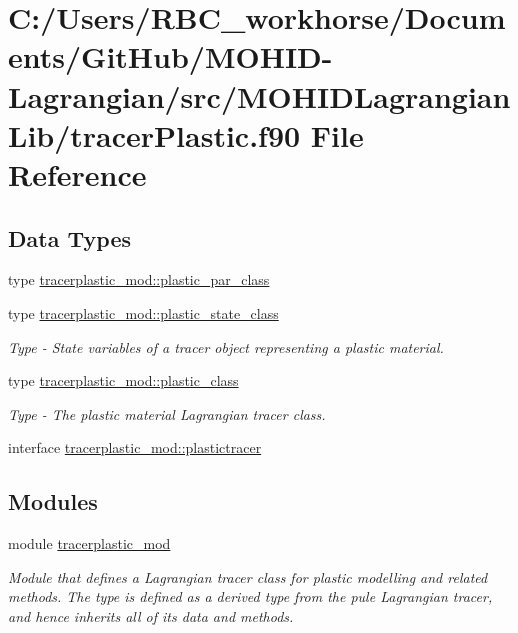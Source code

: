 \hypertarget{tracer_plastic_8f90}{}\section{C\+:/\+Users/\+R\+B\+C\+\_\+workhorse/\+Documents/\+Git\+Hub/\+M\+O\+H\+I\+D-\/\+Lagrangian/src/\+M\+O\+H\+I\+D\+Lagrangian\+Lib/tracer\+Plastic.f90 File Reference}
\label{tracer_plastic_8f90}
\subsection*{Data Types}
\begin{DoxyCompactItemize}
\item 
type \mbox{\hyperlink{structtracerplastic__mod_1_1plastic__par__class}{tracerplastic\+\_\+mod\+::plastic\+\_\+par\+\_\+class}}
\item 
type \mbox{\hyperlink{structtracerplastic__mod_1_1plastic__state__class}{tracerplastic\+\_\+mod\+::plastic\+\_\+state\+\_\+class}}
\begin{DoxyCompactList}\small\item\em Type -\/ State variables of a tracer object representing a plastic material. \end{DoxyCompactList}\item 
type \mbox{\hyperlink{structtracerplastic__mod_1_1plastic__class}{tracerplastic\+\_\+mod\+::plastic\+\_\+class}}
\begin{DoxyCompactList}\small\item\em Type -\/ The plastic material Lagrangian tracer class. \end{DoxyCompactList}\item 
interface \mbox{\hyperlink{interfacetracerplastic__mod_1_1plastictracer}{tracerplastic\+\_\+mod\+::plastictracer}}
\end{DoxyCompactItemize}
\subsection*{Modules}
\begin{DoxyCompactItemize}
\item 
module \mbox{\hyperlink{namespacetracerplastic__mod}{tracerplastic\+\_\+mod}}
\begin{DoxyCompactList}\small\item\em Module that defines a Lagrangian tracer class for plastic modelling and related methods. The type is defined as a derived type from the pule Lagrangian tracer, and hence inherits all of it\textquotesingle{}s data and methods. \end{DoxyCompactList}\end{DoxyCompactItemize}
